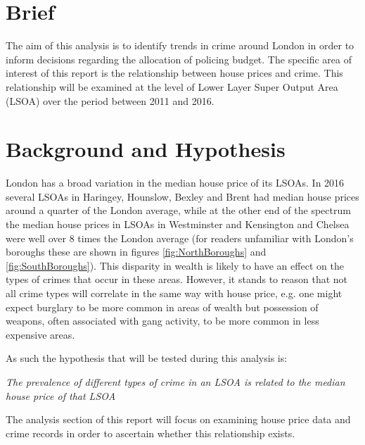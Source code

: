 \documentclass{article}
\begin{document}
\newpage
\section{Brief}

The aim of this analysis is to identify trends in crime around London in order to inform decisions regarding the allocation of policing budget. The specific area of interest of this report is the relationship between house prices and crime. This relationship will be examined at the level of Lower Layer Super Output Area (LSOA) over the period between 2011 and 2016. 

\section{Background and Hypothesis} \label{Background and Hypothesis}

London has a broad variation in the median house price of its LSOAs. In 2016 several LSOAs in Haringey, Hounslow, Bexley and Brent had median house prices around a quarter of the London average, while at the other end of the spectrum the median house prices in LSOAs in Westminster and Kensington and Chelsea were well over 8 times the London average (for readers unfamiliar with London's boroughs these are shown in figures \ref{fig:NorthBoroughs} and \ref{fig:SouthBoroughs}). This disparity in wealth is likely to have an effect on the types of crimes that occur in these areas. However, it stands to reason that not all crime types will correlate in the same way with house price, e.g. one might expect burglary to be more common in areas of wealth but possession of weapons, often associated with gang activity, to be more common in less expensive areas.
\newline

As such the hypothesis that will be tested during this analysis is:
\newline

\textit{The prevalence of different types of crime in an LSOA is related to the median house price of that LSOA}
\newline

The analysis section of this report will focus on examining house price data and crime records in order to ascertain whether this relationship exists.
\end{document}
